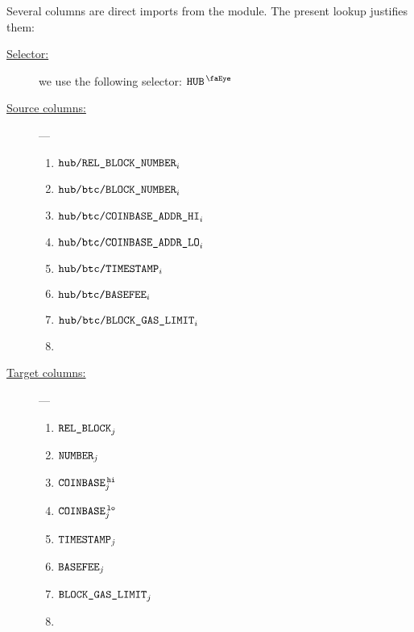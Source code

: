 Several columns are direct imports from the \btcMod{} module.
The present lookup justifies them:
\begin{description}
	\item[\underline{Selector:}]
		we use the following selector: $\isUserTxnHubView$
	\item[\underline{Source columns:}] ---
		\begin{multicols}{2}
			\begin{enumerate}
				\item $\txnDataHubRelBlockNumber _{i}$
				\item $\txnDataHubBlockNumber    _{i}$
				\item $\txnDataHubCoinbaseHi     _{i}$
				\item $\txnDataHubCoinbaseLo     _{i}$
				\item $\txnDataHubTimestamp      _{i}$
				\item $\txnDataHubBasefee        _{i}$
				\item $\txnDataHubBlockGasLimit  _{i}$
				\item[\vspace{\fill}]
			\end{enumerate}
		\end{multicols}
	\item[\underline{Target columns:}] ---
		\begin{multicols}{2}
			\begin{enumerate}
				\item $\relBlock      _{j}$
				\item $\numberr       _{j}$
				\item $\coinbase\high _{j}$
				\item $\coinbase\low  _{j}$
				\item $\timestamp     _{j}$
				\item $\basefee       _{j}$
				\item $\blockGasLimit _{j}$
				\item[\vspace{\fill}]
			\end{enumerate}
		\end{multicols}
\end{description}
